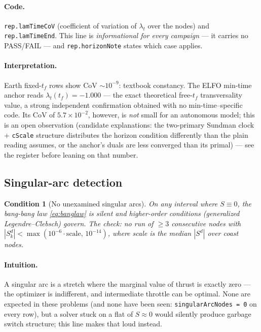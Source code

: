 \documentclass[11pt]{article}
\newcommand{\code}[1]{\texttt{#1}}
\newtheorem{condition}{Condition}
\begin{document}
\paragraph{Code.}
\code{rep.lamTimeCoV} (coefficient of variation of $\lambda_t$ over the nodes)
and \code{rep.lamTimeEnd}. This line is \emph{informational for every
campaign} --- it carries no PASS/FAIL --- and \code{rep.horizonNote} states
which case applies.

\paragraph{Interpretation.}
Earth fixed-$t_f$ rows show CoV $\sim10^{-9}$: textbook constancy. The ELFO
min-time anchor reads $\lambda_t(t_f) = -1.000$ --- the exact theoretical
free-$t_f$ transversality value, a strong independent confirmation obtained
with no min-time--specific code. Its CoV of $5.7\times10^{-2}$, however, is
\emph{not} small for an autonomous model; this is an open observation
(candidate explanations: the two-primary Sundman clock + \code{cScale}
structure distributes the horizon condition differently than the plain
reading assumes, or the anchor's duals are less converged than its primal) ---
see the register before leaning on that number.

\subsection{Singular-arc detection}
\label{sec:singular}

\begin{condition}[No unexamined singular arcs]
On any interval where $S\equiv0$, the bang-bang law \eqref{eq:banglaw} is
silent and higher-order conditions (generalized Legendre--Clebsch) govern.
The check: no run of $\ge 3$ consecutive nodes with
$|S^d_k| < \max(10^{-6}\cdot\mathrm{scale},\,10^{-14})$,
where scale is the median $|S^d|$ over coast nodes.
\end{condition}

\paragraph{Intuition.}
A singular arc is a stretch where the marginal value of thrust is exactly
zero --- the optimizer is indifferent, and intermediate throttle can be
optimal. None are expected in these problems (and none have been seen:
\code{singularArcNodes = 0} on every row), but a solver stuck on a flat of
$S\approx0$ would silently produce garbage switch structure; this line makes
that loud instead.
\end{document}

